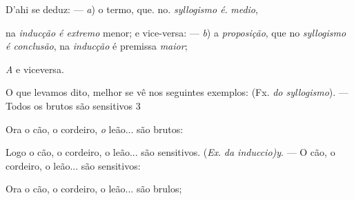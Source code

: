 D'ahi se deduz: --- \emph{a}) o termo, que. no. \emph{syllogismo é}. \emph{medio},

na \emph{inducção é extremo} menor; e vice-versa: --- \emph{b}) a \emph{proposição}, que no \emph{syllogismo é conclusão}, na \emph{inducção} é premissa \emph{maior};

\emph{A} e viceversa. \textbar{} \textbar{}

O que levamos dito, melhor se vê nos seguintes exemplos: (Fx. \emph{do syllogismo}). --- Todos os brutos são sensitivos 3

Ora o cão, o cordeiro, \emph{o} leão... são brutos:

Logo o cão, o cordeiro, o leão... são sensitivos. (\emph{Ex}. \emph{da induccio)y}. --- O cão, o cordeiro, o leão... são sensitivos:

Ora o cão, o cordeiro, o leão... são brulos;

